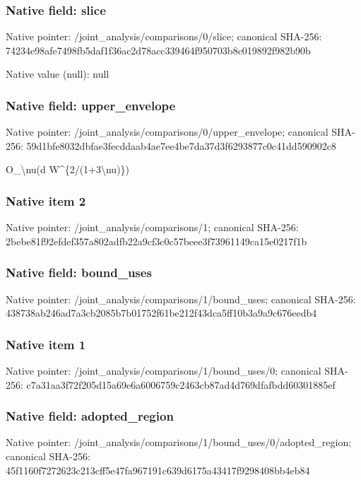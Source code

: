 \documentclass[10pt,a4paper]{article}
\begin{document}
\subsubsection{Native field: slice}
Native pointer: /joint\_\allowbreak{}analysis/comparisons/0/slice; canonical SHA-256: 74234e98afe7498fb5daf1f36ac2d78acc339464f950703b8c019892f982b90b

Native value (null): null

\subsubsection{Native field: upper\_\allowbreak{}envelope}
Native pointer: /joint\_\allowbreak{}analysis/comparisons/0/upper\_\allowbreak{}envelope; canonical SHA-256: 59d1bfe8032dbfae3fecddaab4ae7ee4be7da37d3f6293877c0c41dd590902c8

\begingroup\raggedright\sloppy O\_\allowbreak{}\textbackslash{}nu(d W\textasciicircum{}\{2/\allowbreak{}(1+3\textbackslash{}nu)\})\par\endgroup

\subsubsection{Native item 2}
Native pointer: /joint\_\allowbreak{}analysis/comparisons/1; canonical SHA-256: 2bebe81f92efdef357a802adfb22a9cf3c0c57beee3f73961149ca15e0217f1b

\subsubsection{Native field: bound\_\allowbreak{}uses}
Native pointer: /joint\_\allowbreak{}analysis/comparisons/1/bound\_\allowbreak{}uses; canonical SHA-256: 438738ab246ad7a3cb2085b7b01752f61be212f43dca5ff10b3a9a9c676eedb4

\subsubsection{Native item 1}
Native pointer: /joint\_\allowbreak{}analysis/comparisons/1/bound\_\allowbreak{}uses/0; canonical SHA-256: c7a31aa3f72f205d15a69e6a6006759c2463cb87ad4d769dfafbdd60301885ef

\subsubsection{Native field: adopted\_\allowbreak{}region}
Native pointer: /joint\_\allowbreak{}analysis/comparisons/1/bound\_\allowbreak{}uses/0/adopted\_\allowbreak{}region; canonical SHA-256: 45f1160f7272623c213cff5e47fa967191c639d6175a43417f9298408bb4eb84
\end{document}
